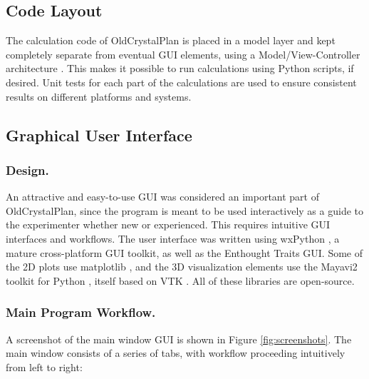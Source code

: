 \documentclass[final]{iucr}              %
\begin{document}
\subsection{Code Layout}

The calculation code of OldCrystalPlan is placed in a model layer and kept
completely separate from eventual GUI elements, using a Model/View-Controller
architecture \cite{Gamma95}. This makes it possible to run calculations using
Python scripts, if desired. Unit tests for each part of the calculations are used to ensure
consistent results on different platforms and  systems.     
  

\subsection{Graphical User Interface}

\subsubsection{Design.}

An attractive and easy-to-use GUI was considered an important part of
OldCrystalPlan, since the program is meant to be used interactively as a guide to
the experimenter whether new or experienced. This requires intuitive GUI
interfaces and workflows.
The user interface was written using wxPython
\cite{wxPython}, a mature cross-platform GUI toolkit, as well as the Enthought
Traits GUI. Some of the 2D plots use matplotlib \cite{matplotlib},  and the 3D
visualization elements use the Mayavi2 toolkit for Python \cite{mayavi}, itself
based on VTK \cite{VTK}. All of these libraries are  open-source.

\subsubsection{Main Program Workflow.}
A screenshot of the main window GUI is shown in Figure \ref{fig:screenshots}.
The main window consists of a series of tabs, with workflow proceeding
intuitively from left to right:
\end{document}
